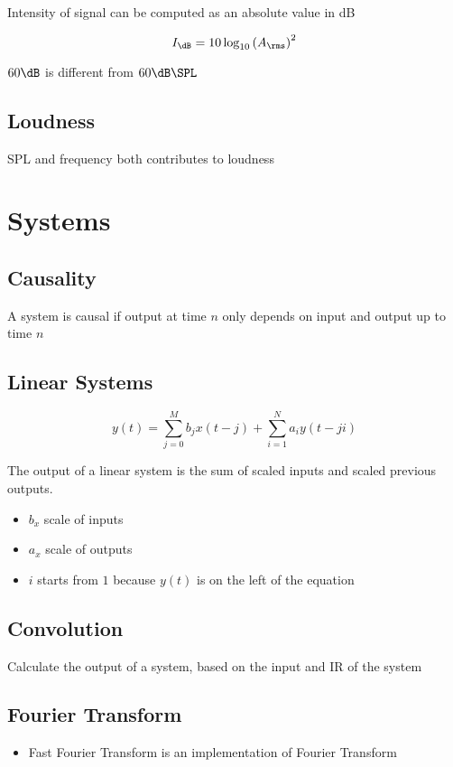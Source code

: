     Intensity of signal can be computed as an absolute value in dB

    \begin{equation}
      I_{\dB} = 10 \log_{10} \left( A_{\rms} \right)^{2}
    \end{equation}

    $ 60 \dB $ is different from $ 60 \dB \SPL $

  \subsection{Loudness}

    SPL and frequency both contributes to loudness

\section{Systems}

  \subsection{Causality}

    A system is causal if output at time $ n $ only depends on input and output
    up to time $ n $

  \subsection{Linear Systems}

    \begin{equation}
      y\left( t \right) =
        \sum_{j = 0}^{M} b_{j} x\left( t - j \right)
        + \sum_{i = 1}^{N} a_{i} y\left( t - ji \right)
    \end{equation}

    The output of a linear system is the sum of scaled inputs and
    scaled previous outputs.

    \begin{itemize}
      \item $ b_{x} $ scale of inputs
      \item $ a_{x} $ scale of outputs
      \item $ i $ starts from $ 1 $ because $ y\left( t \right) $ is on the left
      of the equation
    \end{itemize}

  \subsection{Convolution}

    Calculate the output of a system, based on the input and IR of the system

  \subsection{Fourier Transform}

    \begin{itemize}
      \item Fast Fourier Transform is an implementation of Fourier Transform
    \end{itemize}
